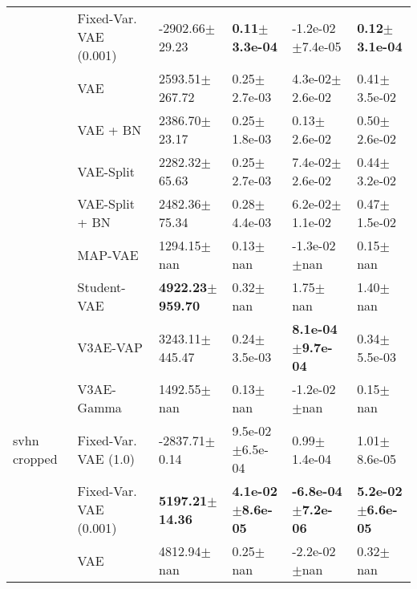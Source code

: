 \begin{tabular}{llllll}
             & Fixed-Var. VAE (0.001) &           -2902.66$\pm$29.23 &     \textbf{0.11$\pm$3.3e-04} &           -1.2e-02$\pm$7.4e-05 &     \textbf{0.12$\pm$3.1e-04} \\
             & VAE &           2593.51$\pm$267.72 &              0.25$\pm$2.7e-03 &            4.3e-02$\pm$2.6e-02 &              0.41$\pm$3.5e-02 \\
             & VAE + BN &            2386.70$\pm$23.17 &              0.25$\pm$1.8e-03 &               0.13$\pm$2.6e-02 &              0.50$\pm$2.6e-02 \\
             & VAE-Split &            2282.32$\pm$65.63 &              0.25$\pm$2.7e-03 &            7.4e-02$\pm$2.6e-02 &              0.44$\pm$3.2e-02 \\
             & VAE-Split + BN &            2482.36$\pm$75.34 &              0.28$\pm$4.4e-03 &            6.2e-02$\pm$1.1e-02 &              0.47$\pm$1.5e-02 \\
             & MAP-VAE &              1294.15$\pm$nan &                  0.13$\pm$nan &               -1.3e-02$\pm$nan &                  0.15$\pm$nan \\
             & Student-VAE &  \textbf{4922.23$\pm$959.70} &                  0.32$\pm$nan &                   1.75$\pm$nan &                  1.40$\pm$nan \\
             & V3AE-VAP &           3243.11$\pm$445.47 &              0.24$\pm$3.5e-03 &   \textbf{8.1e-04$\pm$9.7e-04} &              0.34$\pm$5.5e-03 \\
             & V3AE-Gamma &              1492.55$\pm$nan &                  0.13$\pm$nan &               -1.2e-02$\pm$nan &                  0.15$\pm$nan \\
svhn cropped & Fixed-Var. VAE (1.0) &            -2837.71$\pm$0.14 &           9.5e-02$\pm$6.5e-04 &               0.99$\pm$1.4e-04 &              1.01$\pm$8.6e-05 \\
             & Fixed-Var. VAE (0.001) &   \textbf{5197.21$\pm$14.36} &  \textbf{4.1e-02$\pm$8.6e-05} &  \textbf{-6.8e-04$\pm$7.2e-06} &  \textbf{5.2e-02$\pm$6.6e-05} \\
             & VAE &              4812.94$\pm$nan &                  0.25$\pm$nan &               -2.2e-02$\pm$nan &                  0.32$\pm$nan \\
\bottomrule
\end{tabular}

